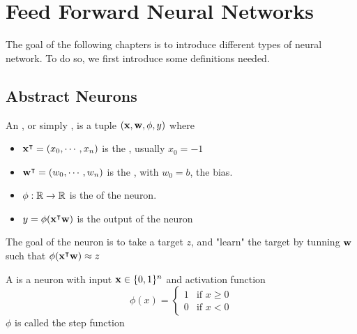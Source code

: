 
\chapter{Feed Forward Neural Networks}

The goal of the following chapters is to introduce different types of neural network. To do so, we first introduce some definitions needed. 

\section{Abstract Neurons}\label{abstractneurons}

\begin{definition}
    An , or simply , is a tuple $(\vx,\vw,\phi,y)$ where
    \begin{itemize}
        \item $\vx^\intercal = (x_0,\cdots,x_n)$ is the , usually $x_0=-1$
        \item $\vw^\intercal = (w_0,\cdots,w_n)$ is the , with $w_0 = b$, the bias.
        \item $\phi:\R\to\R$ is the  of the neuron.
        \item $y=\phi(\vx^\intercal\vw)$ is the output of the neuron
    \end{itemize}
\end{definition}

The goal of the neuron is to take a target $z$, and "learn" the target by tunning $\vw$ such that $\phi(\vx^\intercal\vw) \approx z$ 

\begin{definition}
    A  is a neuron with input $\vx\in\{0,1\}^n$ and activation function
    \begin{equation*}
        \phi(x) = 
        \begin{cases}
            1 & \text{if } x \geq 0\\
            0 & \text{if } x < 0
        \end{cases}
    \end{equation*}
    $\phi$ is called the  step function
\end{definition}

